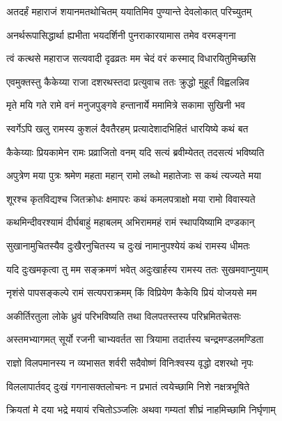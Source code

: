 
\twolineshloka
{अतदर्हं महाराजं शयानमतथोचितम्}
{ययातिमिव पुण्यान्ते देवलोकात् परिच्युतम्} %

\twolineshloka
{अनर्थरूपासिद्धार्था ह्यभीता भयदर्शिनी}
{पुनराकारयामास तमेव वरमङ्गना} %

\twolineshloka
{त्वं कत्थसे महाराज सत्यवादी दृढव्रतः}
{मम चेदं वरं कस्माद् विधारयितुमिच्छसि} %

\twolineshloka
{एवमुक्तस्तु कैकेय्या राजा दशरथस्तदा}
{प्रत्युवाच ततः क्रुद्धो मुहूर्तं विह्वलन्निव} %

\twolineshloka
{मृते मयि गते रामे वनं मनुजपुङ्गवे}
{हन्तानार्ये ममामित्रे सकामा सुखिनी भव} %

\twolineshloka
{स्वर्गेऽपि खलु रामस्य कुशलं दैवतैरहम्}
{प्रत्यादेशादभिहितं धारयिष्ये कथं बत} %

\twolineshloka
{कैकेय्याः प्रियकामेन रामः प्रव्राजितो वनम्}
{यदि सत्यं ब्रवीम्येतत् तदसत्यं भविष्यति} %

\twolineshloka
{अपुत्रेण मया पुत्रः श्रमेण महता महान्}
{रामो लब्धो महातेजाः स कथं त्यज्यते मया} %

\twolineshloka
{शूरश्च कृतविद्यश्च जितक्रोधः क्षमापरः}
{कथं कमलपत्राक्षो मया रामो विवास्यते} %

\twolineshloka
{कथमिन्दीवरश्यामं दीर्घबाहुं महाबलम्}
{अभिराममहं रामं स्थापयिष्यामि दण्डकान्} %

\twolineshloka
{सुखानामुचितस्यैव दुःखैरनुचितस्य च}
{दुःखं नामानुपश्येयं कथं रामस्य धीमतः} %

\twolineshloka
{यदि दुःखमकृत्वा तु मम सङ्क्रमणं भवेत्}
{अदुःखार्हस्य रामस्य ततः सुखमवाप्नुयाम्} %

\twolineshloka
{नृशंसे पापसङ्कल्पे रामं सत्यपराक्रमम्}
{किं विप्रियेण कैकेयि प्रियं योजयसे मम} %

\twolineshloka
{अकीर्तिरतुला लोके ध्रुवं परिभविष्यति}
{तथा विलपतस्तस्य परिभ्रमितचेतसः} %

\twolineshloka
{अस्तमभ्यागमत् सूर्यो रजनी चाभ्यवर्तत}
{सा त्रियामा तदार्तस्य चन्द्रमण्डलमण्डिता} %

\twolineshloka
{राज्ञो विलपमानस्य न व्यभासत शर्वरी}
{सदैवोष्णं विनिःश्वस्य वृद्धो दशरथो नृपः} %

\twolineshloka
{विललापार्तवद् दुःखं गगनासक्तलोचनः}
{न प्रभातं त्वयेच्छामि निशे नक्षत्रभूषिते} %

\twolineshloka
{क्रियतां मे दया भद्रे मयायं रचितोऽञ्जलिः}
{अथवा गम्यतां शीघ्रं नाहमिच्छामि निर्घृणाम्} %

